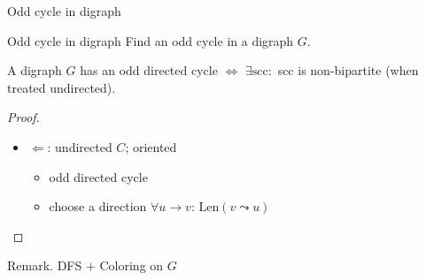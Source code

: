 \begin{frame}{Odd cycle in digraph}
  \begin{exampleblock}{Odd cycle in digraph }
    Find an odd cycle in a digraph $G$.
  \end{exampleblock}

  \begin{lemma}
    A digraph $G$ has an odd directed cycle $\iff$ $\exists \text{scc}: $ scc is non-bipartite (when treated undirected).
  \end{lemma}

  \begin{proof}
    \begin{itemize}
      \item $\Leftarrow$: undirected $C$; oriented
	\begin{itemize}
	  \item odd directed cycle
	  \item choose a direction $\forall u \to v$: $\text{Len}(v \leadsto u)$ 
	\end{itemize}
    \end{itemize}
  \end{proof}

  \begin{alertblock}{Remark.}
    DFS + Coloring on $G$
  \end{alertblock}
\end{frame}
